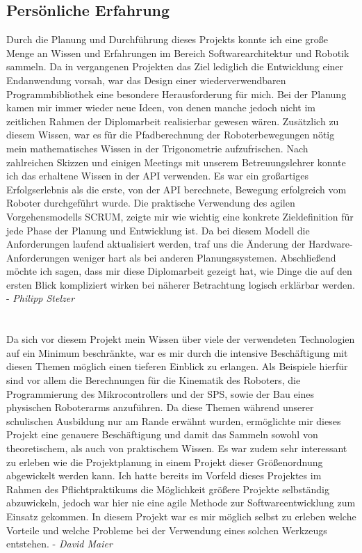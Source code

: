 \subsection{Persönliche Erfahrung}
\par
\begingroup
\leftskip=1cm 
\rightskip=1cm 
\noindent
Durch die Planung und Durchführung dieses Projekts konnte ich eine große Menge an Wissen und Erfahrungen im Bereich Softwarearchitektur und Robotik sammeln. Da in vergangenen Projekten das Ziel lediglich die Entwicklung einer Endanwendung vorsah, war das Design einer wiederverwendbaren Programmbibliothek eine besondere Herausforderung für mich. Bei der Planung kamen mir immer wieder neue Ideen, von denen manche jedoch nicht im zeitlichen Rahmen der Diplomarbeit realisierbar gewesen wären. Zusätzlich zu diesem Wissen, war es für die Pfadberechnung der Roboterbewegungen nötig mein mathematisches Wissen in der Trigonometrie aufzufrischen. Nach zahlreichen Skizzen und einigen Meetings mit unserem Betreuungslehrer konnte ich das erhaltene Wissen in der API verwenden. Es war ein großartiges Erfolgserlebnis als die erste, von der API berechnete, Bewegung erfolgreich vom Roboter durchgeführt wurde. Die praktische Verwendung des agilen Vorgehensmodells SCRUM, zeigte mir wie wichtig eine konkrete Zieldefinition für jede Phase der Planung und Entwicklung ist. Da bei diesem Modell die Anforderungen laufend aktualisiert werden, traf uns die Änderung der Hardware-Anforderungen weniger hart als bei anderen Planungssystemen. Abschließend möchte ich sagen, dass mir diese Diplomarbeit gezeigt hat, wie Dinge die auf den ersten Blick kompliziert wirken bei näherer Betrachtung logisch erklärbar werden. - \textit{Philipp Stelzer}
\\\\
\\
Da sich vor diesem Projekt mein Wissen über viele der verwendeten Technologien auf ein Minimum beschränkte, war es mir durch die intensive Beschäftigung mit diesen Themen möglich einen tieferen Einblick zu erlangen. Als Beispiele hierfür sind vor allem die Berechnungen für die Kinematik des Roboters, die Programmierung des Mikrocontrollers und der SPS, sowie der Bau eines physischen Roboterarms anzuführen. Da diese Themen während unserer schulischen Ausbildung nur am Rande erwähnt wurden, ermöglichte mir dieses Projekt eine genauere Beschäftigung und damit das Sammeln sowohl von theoretischem, als auch von praktischem Wissen.
Es war zudem sehr interessant zu erleben wie die Projektplanung in einem Projekt dieser Größenordnung abgewickelt werden kann. Ich hatte bereits im Vorfeld dieses Projektes im Rahmen des Pflichtpraktikums die Möglichkeit größere Projekte selbständig abzuwickeln, jedoch war hier nie eine agile Methode zur Softwareentwicklung zum Einsatz gekommen. 
\newpage
In diesem Projekt war es mir möglich selbst zu erleben welche Vorteile und welche Probleme bei der Verwendung eines solchen Werkzeugs entstehen.  - \textit{David Maier}
\par
\endgroup
